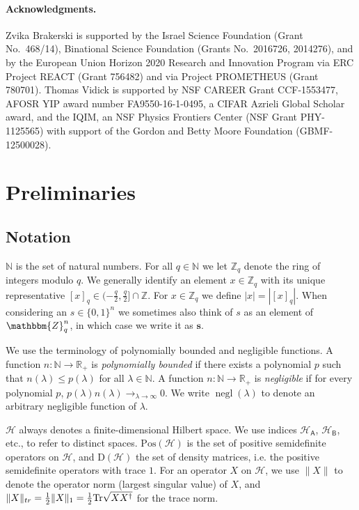 \documentclass[11pt]{article}
\theoremstyle{remark}
\theoremstyle{definition}
\newcommand{\Tr}{\mbox{\rm Tr}}
\newcommand{\reg}[1]{{\textsf{#1}}}
\newcommand{\N}{\ensuremath{\mathbb{N}}}
\newcommand{\bbN}{\ensuremath{\mathbb{N}}}
\newcommand{\R}{\ensuremath{\mathbb{R}}}
\newcommand{\mH}{\mathcal{H}}
\newcommand{\setft}[1]{\mathrm{#1}}
\newcommand{\Density}{\setft{D}}
\newcommand{\Pos}{\setft{Pos}}
\DeclareMathOperator{\negl}{negl}
\newcommand{\mZ}{\mathbbm{Z}}
\newcommand{\trnq}[1]{\left[ {#1} \right]_q}
\newcommand{\bbZ}{\mathbb{Z}}
\newcommand{\abs}[1]{\left\vert {#1} \right\vert}
\def\*#1{\mathbf{#1}}
\begin{document}
\paragraph{Acknowledgments.}
Zvika Brakerski is supported by the Israel Science Foundation (Grant No.\ 468/14), Binational Science Foundation (Grants No.\ 2016726, 2014276), and by the European Union Horizon 2020 Research and Innovation Program via ERC Project REACT (Grant 756482) and via Project PROMETHEUS (Grant 780701).
Thomas Vidick is supported by NSF CAREER Grant CCF-1553477, AFOSR YIP award number FA9550-16-1-0495, a CIFAR Azrieli Global Scholar award, and the IQIM, an NSF Physics Frontiers Center (NSF Grant PHY-1125565) with support of the Gordon and Betty Moore Foundation (GBMF-12500028).

\section{Preliminaries}
\label{sec:prelim}

\subsection{Notation}

$\N$ is the set of natural numbers. 
For all $q \in \bbN$ we let $\bbZ_q$ denote the ring of integers modulo $q$. We generally identify an element $x\in\bbZ_q$ with its unique representative $\trnq{x}\in (-\tfrac{q}{2}, \tfrac{q}{2}] \cap \bbZ$. For $x\in\bbZ_q$ we define $\abs{x}=|{\trnq{x}}|$.
When considering an $s\in \{0,1\}^n$ we sometimes also think of $s$ as an element of $\mZ_q^n$, in which case we write it as $\*s$. 

We use the terminology of polynomially bounded and negligible functions. A function $n: \N \to \R_+$ is \emph{polynomially bounded} if there exists a polynomial $p$ such that $n(\lambda)\leq p(\lambda)$ for all $\lambda \in \N$. A function $n: \N \to \R_+$ is \emph{negligible} if for every polynomial $p$, $p(\lambda) n(\lambda)\to_{\lambda\to\infty} 0$. We write $\negl(\lambda)$ to denote an arbitrary negligible function of $\lambda$. 

 $\mH$ always denotes a finite-dimensional Hilbert space. We use indices $\mH_\reg{A}$, $\mH_\reg{B}$, etc., to refer to distinct spaces. $\Pos(\mH)$ is the set of positive semidefinite operators on $\mH$, and $\Density(\mH)$ the set of density matrices, i.e. the positive semidefinite operators with trace $1$. For an operator $X$ on $\mH$, we use $\|X\|$ to denote the operator norm (largest singular value) of $X$, and $\|X\|_{tr} = \frac{1}{2}\|X\|_1 = \frac{1}{2}\Tr\sqrt{XX^\dagger}$ for the trace norm. 
\end{document}
